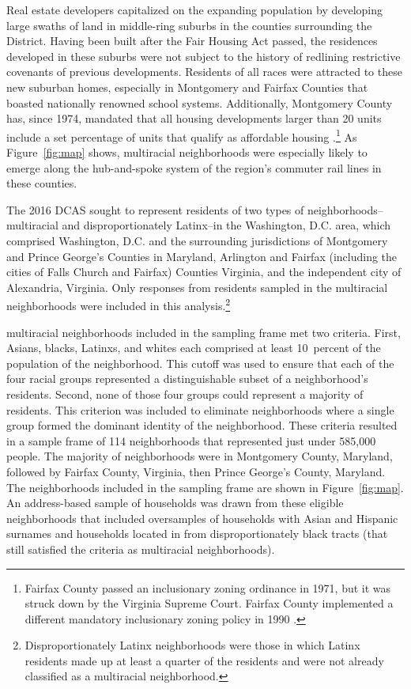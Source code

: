 \documentclass{baderart}
\begin{document}
Real estate developers capitalized on the expanding population by developing large swaths of land in middle-ring suburbs in the counties surrounding the District. Having been built after the Fair Housing Act passed, the residences developed in these suburbs were not subject to the history of redlining restrictive covenants of previous developments. Residents of all races were attracted to these new suburban homes, especially in Montgomery and Fairfax Counties that boasted nationally renowned school systems. Additionally, Montgomery County has, since 1974, mandated that all housing developments larger than 20 units include a set percentage of units that qualify as affordable housing \citep{urban_institute_expanding_2012}.\footnote{Fairfax County passed an inclusionary   zoning ordinance in 1971, but it was struck down by the Virginia   Supreme Court. Fairfax County implemented a different mandatory   inclusionary zoning policy in 1990 \citep{silverstein_welcome_2017}.} As Figure~\ref{fig:map} shows, multiracial neighborhoods were especially likely to emerge along the hub-and-spoke system of the region's commuter rail lines in these counties.


The 2016 DCAS sought to represent residents of two types of neighborhoods--multiracial and disproportionately Latinx--in the Washington, D.C. area, which comprised Washington, D.C. and the surrounding jurisdictions of Montgomery and Prince George's Counties in Maryland, Arlington and Fairfax (including the cities of Falls Church and Fairfax) Counties Virginia, and the independent city of Alexandria, Virginia. Only responses from residents sampled in the multiracial neighborhoods were included in this analysis.\footnote{Disproportionately   Latinx neighborhoods were those in which Latinx residents made up at   least a quarter of the residents and were not already classified as a   multiracial neighborhood.}

multiracial neighborhoods included in the sampling frame met two criteria. First, Asians, blacks, Latinxs, and whites each comprised at least 10~percent of the population of the neighborhood. This cutoff was used to ensure that each of the four racial groups represented a distinguishable subset of a neighborhood's residents. Second, none of those four groups could represent a majority of residents. This criterion was included to eliminate neighborhoods where a single group formed the dominant identity of the neighborhood. These criteria resulted in a sample frame of 114 neighborhoods that represented just under 585,000 people. The majority of neighborhoods were in Montgomery County, Maryland, followed by Fairfax County, Virginia, then Prince George's County, Maryland. The neighborhoods included in the sampling frame are shown in Figure~\ref{fig:map}. An address-based sample of households was drawn from these eligible neighborhoods that included oversamples of households with Asian and Hispanic surnames and households located in from disproportionately black tracts (that still satisfied the criteria as multiracial neighborhoods).
\end{document}
